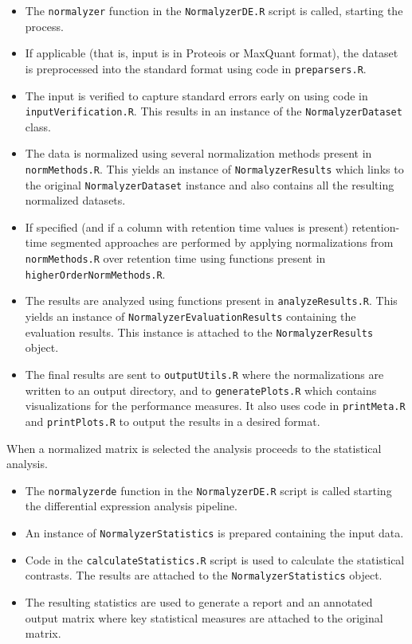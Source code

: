 \documentclass[]{article}
\providecommand{\tightlist}{%
  \setlength{\itemsep}{0pt}\setlength{\parskip}{0pt}}
\begin{document}
\begin{itemize}
\tightlist
\item
  The \texttt{normalyzer} function in the \texttt{NormalyzerDE.R} script is called, starting the process.
\item
  If applicable (that is, input is in Proteois or MaxQuant format), the dataset is preprocessed into the standard format using code in \texttt{preparsers.R}.
\item
  The input is verified to capture standard errors early on using code in \texttt{inputVerification.R}. This results in an instance of the \texttt{NormalyzerDataset} class.
\item
  The data is normalized using several normalization methods present in \texttt{normMethods.R}. This yields an instance of \texttt{NormalyzerResults} which links to the original \texttt{NormalyzerDataset} instance and also contains all the resulting normalized datasets.
\item
  If specified (and if a column with retention time values is present) retention-time segmented approaches are performed by applying normalizations from \texttt{normMethods.R} over retention time using functions present in \texttt{higherOrderNormMethods.R}.
\item
  The results are analyzed using functions present in \texttt{analyzeResults.R}. This yields an instance of \texttt{NormalyzerEvaluationResults} containing the evaluation results. This instance is attached to the \texttt{NormalyzerResults} object.
\item
  The final results are sent to \texttt{outputUtils.R} where the normalizations are written to an output directory, and to \texttt{generatePlots.R} which contains visualizations for the performance measures. It also uses code in \texttt{printMeta.R} and \texttt{printPlots.R} to output the results in a desired format.
\end{itemize}

When a normalized matrix is selected the analysis proceeds to the statistical analysis.

\begin{itemize}
\tightlist
\item
  The \texttt{normalyzerde} function in the \texttt{NormalyzerDE.R} script is called starting the differential expression analysis pipeline.
\item
  An instance of \texttt{NormalyzerStatistics} is prepared containing the input data.
\item
  Code in the \texttt{calculateStatistics.R} script is used to calculate the statistical contrasts. The results are attached to the \texttt{NormalyzerStatistics} object.
\item
  The resulting statistics are used to generate a report and an annotated output matrix where key statistical measures are attached to the original matrix.
\end{itemize}
\end{document}
